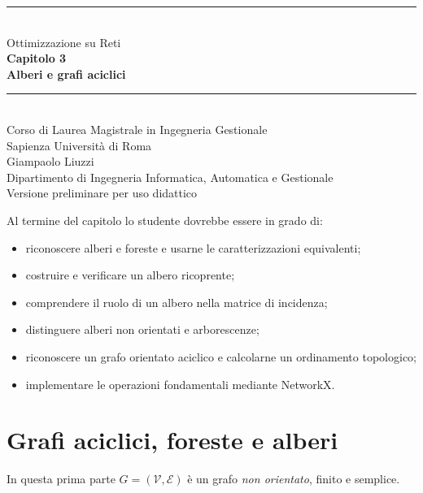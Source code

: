 \documentclass[11pt,a4paper]{article}
\newcommand{\V}{\mathcal{V}}
\newcommand{\E}{\mathcal{E}}
\begin{document}
\hypersetup{pageanchor=false}
\begin{titlepage}
\centering
\vspace*{1.6cm}
{\color{sapienzared}\rule{\textwidth}{1.2pt}}\\[1.1cm]
{\Large Ottimizzazione su Reti}\\[0.35cm]
{\huge\bfseries Capitolo 3}\\[0.45cm]
{\LARGE\bfseries Alberi e grafi aciclici}\\[1.1cm]
{\color{sapienzared}\rule{0.72\textwidth}{0.8pt}}\\[1.1cm]
{\large Corso di Laurea Magistrale in Ingegneria Gestionale}\\[0.25cm]
{\large Sapienza Università di Roma}\\[1.2cm]
{\large Giampaolo Liuzzi}\\[0.25cm]
{\normalsize Dipartimento di Ingegneria Informatica, Automatica e Gestionale}\\[2cm]
\vfill
{\small Versione preliminare per uso didattico}
\end{titlepage}
\hypersetup{pageanchor=true}
\tableofcontents
\newpage
{}

\begin{learningbox}
Al termine del capitolo lo studente dovrebbe essere in grado di:
\begin{itemize}[nosep]
\item riconoscere alberi e foreste e usarne le caratterizzazioni equivalenti;
\item costruire e verificare un albero ricoprente;
\item comprendere il ruolo di un albero nella matrice di incidenza;
\item distinguere alberi non orientati e arborescenze;
\item riconoscere un grafo orientato aciclico e calcolarne un ordinamento topologico;
\item implementare le operazioni fondamentali mediante NetworkX.
\end{itemize}
\end{learningbox}

\section{Grafi aciclici, foreste e alberi}

In questa prima parte $G=(\V,\E)$ è un grafo \emph{non orientato}, finito e semplice.
\end{document}
